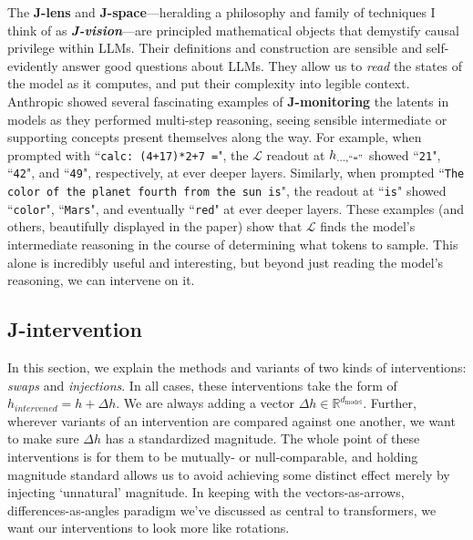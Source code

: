 \documentclass{article}
\newcommand{\jlens}{\mathscr{L}}
\newcommand{\dmodel}{d_{\text{model}}}
\begin{document}
The \textbf{J-lens} and \textbf{J-space}---heralding a philosophy and family of techniques I think of as \textit{\textbf{J-vision}}---are principled mathematical objects that demystify causal privilege within LLMs. Their definitions and construction are sensible and self-evidently answer good questions about LLMs. They allow us to \textit{read} the states of the model as it computes, and put their complexity into legible context. Anthropic showed several fascinating examples of \textbf{J-monitoring} the latents in models as they performed multi-step reasoning, seeing sensible intermediate or supporting concepts present themselves along the way. For example, when prompted with ``\texttt{calc: (4+17)*2+7 =}", the \(\jlens\) readout at \(h_{..., ``\texttt{=}"}\) showed ``\texttt{21}", ``\texttt{42}", and ``\texttt{49}", respectively, at ever deeper layers. Similarly, when prompted ``\texttt{The color of the planet fourth from the sun is}", the readout at ``\texttt{is}" showed ``\texttt{color}", ``\texttt{Mars}", and eventually ``\texttt{red}" at ever deeper layers. These examples (and others, beautifully displayed in the paper) show that \(\jlens\) finds the model's intermediate reasoning in the course of determining what tokens to sample. This alone is incredibly useful and interesting, but beyond just reading the model's reasoning, we can intervene on it. 


\subsection{J-intervention}

In this section, we explain the methods and variants of two kinds of interventions: \textit{swaps} and \textit{injections}. In all cases, these interventions take the form of \(h_{intervened} = h + \Delta h\). We are always adding a vector \(\Delta h\in \mathbb{R}^{\dmodel}\). Further, wherever variants of an intervention are compared against one another, we want to make sure \(\Delta h\) has a standardized magnitude. The whole point of these interventions is for them to be mutually- or null-comparable, and holding magnitude standard allows us to avoid achieving some distinct effect merely by injecting `unnatural' magnitude. In keeping with the vectors-as-arrows, differences-as-angles paradigm we've discussed as central to transformers, we want our interventions to look more like rotations. 
\end{document}
